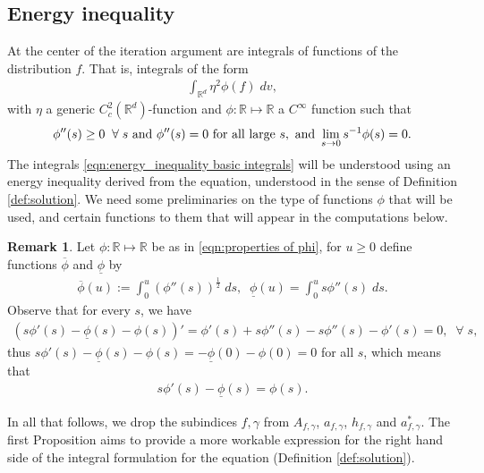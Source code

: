 \documentclass[12pt,american]{amsart}
\numberwithin{equation}{section}
\theoremstyle{plain}
\theoremstyle{definition}                  %
\newtheorem{rem}[thm]{Remark}
\begin{document}
\subsection{Energy inequality}\label{sec: energy ineq}
  At the center of the iteration argument are integrals of functions of the distribution $f$. That is, integrals of the form
  \begin{align}\label{eqn:energy_inequality basic integrals}
    \int_{\mathbb{R}^d} \eta^2 \phi(f) \;dv,
  \end{align}
  with $\eta$ a generic $C^2_c(\mathbb{R}^d)$-function and $\phi:\mathbb{R}\mapsto\mathbb{R}$ a $C^\infty$ function such that
  \begin{align}\label{eqn:properties of phi}
    \phi''(s) \geq 0 \;\;\forall\;s \textnormal{ and } \phi''(s) = 0 \textnormal{ for all large } s, \textnormal{ and } \lim\limits_{s\to 0} s^{-1}\phi(s) = 0.
  \end{align}
  The integrals \eqref{eqn:energy_inequality basic integrals} will be understood using an energy inequality derived from the equation, understood in the sense of Definition \ref{def:solution}. We need some preliminaries on the type of functions $\phi$ that will be used, and certain functions to them that will appear in the computations below.
  \begin{rem}\label{rem:definition of overline phi and underline phi}
    Let $\phi:\mathbb{R}\mapsto\mathbb{R}$ be as in \eqref{eqn:properties of phi}, for $u\geq 0$ define functions $\overline{\phi}$ and $\underline{\phi}$ by
    \begin{align}\label{eqn:overline phi and underline phi}
      \overline{\phi}(u) := \int_0^u (\phi''(s))^{\frac{1}{2}}\;ds,\;\;\underline{\phi}(u) = \int_0^u s\phi''(s)\;ds.
    \end{align}
    Observe that for every $s$, we have
    \begin{align*}
      (s\phi'(s)-\underline{\phi}(s)-\phi(s))' = \phi'(s)+s\phi''(s)-s\phi''(s)-\phi'(s) = 0,\;\;\forall\;s,
    \end{align*}	  
    thus $s\phi'(s)-\underline{\phi}(s)-\phi(s) = -\underline{\phi}(0)-\phi(0) = 0$ for all $s$, which means that
    \begin{align*}
      s\phi'(s)-\underline{\phi}(s) = \phi(s).
    \end{align*}	   
  \end{rem}

  In all that follows, we drop the subindices $f,\gamma$ from $A_{f,\gamma}$, $a_{f,\gamma}$, $h_{f,\gamma}$ and $a_{f,\gamma}^*$. The first Proposition aims to provide a more workable expression for the right hand side of the integral formulation for the equation (Definition \ref{def:solution}).
\end{document}
